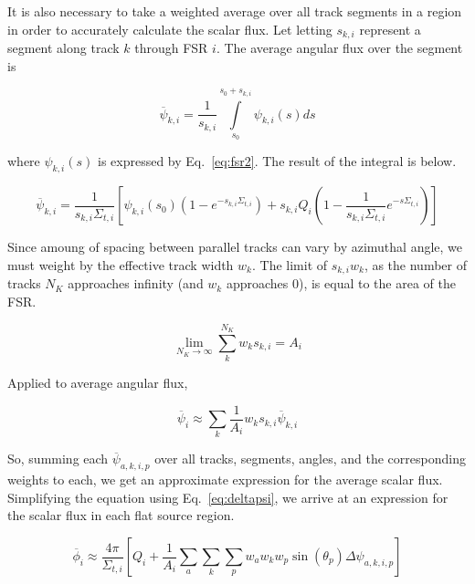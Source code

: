 \documentclass[12pt]{article}
\begin{document}
It is also necessary to take a weighted average over all track segments in a region in order to accurately calculate the scalar flux. Let letting $s_{k,i}$ represent a segment along track $k$ through FSR $i$. The average angular flux over the segment is

\begin{equation}\label{eq:segmentaverage}
\overline{\psi}_{k,i} = \frac{1}{s_{k,i}} 
\int\limits_{s_0}^{s_0 + s_{k,i}} \psi_{k, i}(s) ds
\end{equation}

where $\psi_{k, i}(s)$ is expressed by Eq.~\ref{eq:fsr2}. The result of the integral is below.

\begin{equation}\label{eq:segmentintegral}
\overline{\psi}_{k,i} = \frac{1}{s_{k,i} \Sigma_{t,i}}  \left[
\psi_{k,i}(s_0) \left(1 - e^{-s_{k,i} \Sigma_{t,i}}\right) + 
s_{k,i} Q_i \left(1 - 
\frac{1}{s_{k,i} \Sigma_{t,i}} e^{-s \Sigma_{t,i}} \right)
\right] 
\end{equation}

Since amoung of spacing between parallel tracks can vary by azimuthal angle, we must weight by the effective track width $w_k$. The limit of $s_{k,i} w_k$, as the number of tracks $N_K$ approaches infinity (and $w_k$ approaches 0), is equal to the area of the FSR.

\begin{equation}\label{eq:area}
\lim\limits_{N_K \to \infty} \sum\limits_k^{N_K} w_k s_{k,i} = A_i
\end{equation}

Applied to average angular flux,

\begin{equation}\label{eq:wkski}
\overline{\psi}_i \approx 
\sum\limits_k \frac{1}{A_i} w_k s_{k,i} \overline{\psi}_{k,i}
\end{equation}

So, summing each $\overline{\psi}_{a,k,i,p}$ over all tracks, segments, angles, and the corresponding weights to each, we get an approximate expression for the average scalar flux. Simplifying the equation using Eq.~\ref{eq:deltapsi}, we arrive at an expression for the scalar flux in each flat source region.

\begin{equation}\label{eq:scalarflux}
\overline{\phi}_{i} \approx \frac{4\pi}{\Sigma_{t,i}} \left[
Q_i + \frac{1}{A_i}
\sum\limits_a \sum\limits_k \sum\limits_p
w_a w_k w_p \sin(\theta_p)
\Delta\psi_{a,k,i,p} \right]
\end{equation}
\end{document}
